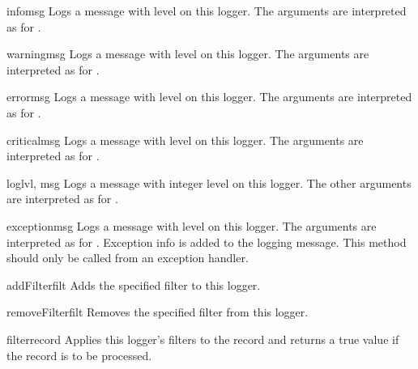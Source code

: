 \begin{methoddesc}{info}{msg}
Logs a message with level  on this logger.
The arguments are interpreted as for .
\end{methoddesc}

\begin{methoddesc}{warning}{msg}
Logs a message with level  on this logger.
The arguments are interpreted as for .
\end{methoddesc}

\begin{methoddesc}{error}{msg}
Logs a message with level  on this logger.
The arguments are interpreted as for .
\end{methoddesc}

\begin{methoddesc}{critical}{msg}
Logs a message with level  on this logger.
The arguments are interpreted as for .
\end{methoddesc}

\begin{methoddesc}{log}{lvl, msg}
Logs a message with integer level  on this logger.
The other arguments are interpreted as for .
\end{methoddesc}

\begin{methoddesc}{exception}{msg}
Logs a message with level  on this logger.
The arguments are interpreted as for . Exception info
is added to the logging message. This method should only be called
from an exception handler.
\end{methoddesc}

\begin{methoddesc}{addFilter}{filt}
Adds the specified filter  to this logger.
\end{methoddesc}

\begin{methoddesc}{removeFilter}{filt}
Removes the specified filter  from this logger.
\end{methoddesc}

\begin{methoddesc}{filter}{record}
Applies this logger's filters to the record and returns a true value if
the record is to be processed.
\end{methoddesc}

